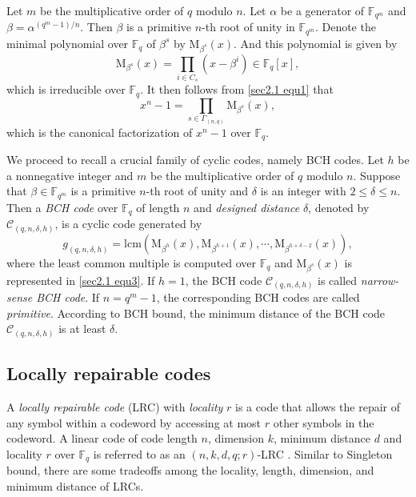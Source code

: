\documentclass[10pt]{article}%
\begin{document}
	Let $m$ be the multiplicative order of $q$ modulo $n$. Let $\alpha$ be a generator of $\mathbb{F}_{q^m}$ and $\beta=\alpha^{(q^m-1)/n}$. Then $\beta$ is a primitive $n$-th root of unity in $\mathbb{F}_{q^m}$. Denote the minimal	polynomial over $\mathbb{F}_q$ of $\beta^s$ by $\mathrm{M}_{\beta^s}(x)$. And this polynomial is given by
	\begin{equation}\label{sec2.1 equ3}
		\mathrm{M}_{\beta^s}(x)=\prod\limits_{i\in C_s}(x-\beta^i)\in\mathbb{F}_q[x],
	\end{equation}
	which is irreducible over $\mathbb{F}_q$. It then follows from \cref{sec2.1 equ1} that
	\begin{equation*}
		x^n-1=\prod_{s\in\Gamma_{(n,q)}}\mathrm{M}_{\beta^s}(x),
	\end{equation*}
	which is the canonical factorization of $x^n - 1$ over $\mathbb{F}_q$.
	
	We proceed to recall a crucial family of cyclic codes, namely BCH codes. Let $h$ be a nonnegative integer and $m$ be the multiplicative order of $q$ modulo $n$. Suppose that $\beta\in\mathbb{F}_{q^m}$ is a primitive $n$-th root of unity and $\delta$ is an integer with $2\le\delta\le n$. Then a \textit{BCH code} over $\mathbb{F}_q$ of length $n$ and \textit{designed distance} $\delta$, denoted by $\mathcal{C}_{(q,n,\delta,h)}$, is a cyclic code generated by 
	\begin{equation*}
		g_{(q,n,\delta,h)}=\mathrm{lcm}\left(\mathrm{M}_{\beta^h}(x),\mathrm{M}_{\beta^{h+1}}(x),\cdots,\mathrm{M}_{\beta^{h+\delta-2}}(x)\right),
	\end{equation*}
	where the least common multiple is computed over $\mathbb{F}_q$ and $\mathrm{M}_{\beta^s}(x)$ is represented in \cref{sec2.1 equ3}. If $h=1$, the BCH code $\mathcal{C}_{(q,n,\delta,h)}$ is called \textit{narrow-sense BCH code}. If $n=q^m-1$, the corresponding BCH codes are called \textit{primitive}.  According to BCH bound, the minimum distance of the BCH code $\mathcal{C}_{(q,n,\delta,h)}$ is at least $\delta$.
	
	\subsection{Locally repairable codes}
	
	A \textit{locally repairable code} (LRC) with \textit{locality} $r$ is a code that allows the repair of any symbol within a codeword by accessing at most $r$ other symbols in the codeword. A linear code of code length	$n$, dimension $k$, minimum distance $d$ and locality $r$ over $\mathbb{F}_q$ is referred to as an $(n, k, d, q; r)$-LRC \cite{Tan2019OptimalCyclicLocally}. Similar to Singleton bound, there are some tradeoffs among the locality, length, dimension,  and minimum distance of LRCs.
	
\end{document}

